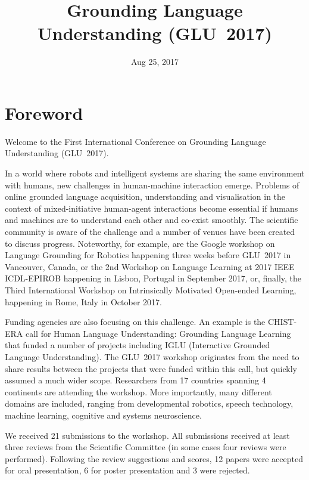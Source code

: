 \documentclass{confproc}
\title{Grounding Language Understanding (GLU~2017)}
\date{Aug 25, 2017}
\begin{document}
\maketitle
\newpage
\section*{Foreword}
Welcome to the First International Conference on Grounding Language Understanding (GLU~2017).

In a world where robots and intelligent systems are sharing the same environment with humans, new challenges in human-machine interaction emerge.
Problems of online grounded language acquisition, understanding and visualisation in the context of mixed-initiative human-agent interactions become essential if humans and machines are to understand each other and co-exist smoothly.
The scientific community is aware of the challenge and a number of venues have been created to discuss progress.
Noteworthy, for example, are the Google workshop on Language Grounding for Robotics happening three weeks before GLU~2017 in Vancouver, Canada, or the 2nd Workshop on Language Learning at 2017 IEEE ICDL-EPIROB happening in Lisbon, Portugal in September 2017, or, finally, the Third International Workshop on Intrinsically Motivated Open-ended Learning, happening in Rome, Italy in October 2017.

Funding agencies are also focusing on this challenge.
An example is the CHIST-ERA call for Human Language Understanding: Grounding Language Learning that funded a number of projects including IGLU (Interactive Grounded Language Understanding).
The GLU~2017 workshop originates from the need to share results between the projects that were funded within this call, but quickly assumed a much wider scope.
Researchers from 17 countries spanning 4 continents are attending the workshop.
More importantly, many different domains are included, ranging from developmental robotics, speech technology, machine learning, cognitive and systems neuroscience.

We received 21 submissions to the workshop. All submissions received at least three reviews from the Scientific Committee (in some cases four reviews were performed). Following the review suggestions and scores, 12 papers were accepted for oral presentation, 6 for poster presentation and 3 were rejected.
\end{document}
